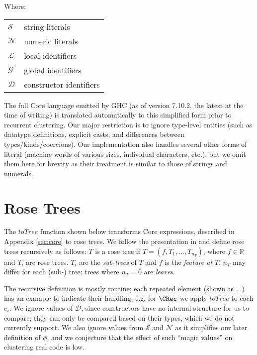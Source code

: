 Where:
\begin{tabular}[t]{l @{ $=$ } l}
  $\mathcal{S}$ & string literals    \\
  $\mathcal{N}$ & numeric literals   \\
  $\mathcal{L}$ & local identifiers  \\
  $\mathcal{G}$ & global identifiers \\
  $\mathcal{D}$ & constructor identifiers
\end{tabular}

The full Core language emitted by GHC (as of version 7.10.2, the latest at the
time of writing) is translated automatically to this simplified form prior to
recurrent clustering. Our major restriction is to ignore type-level entities
(such as datatype definitions, explicit casts, and differences between
types/kinds/coercions). Our implementation also handles several other forms of
literal (machine words of various sizes, individual characters, etc.), but we
omit them here for brevity as their treatment is similar to those of strings and
numerals.

\section{Rose Trees}\label{sec:rosetree}

The $toTree$ function shown below transforms Core expressions, described in
Appendix \ref{sec:core} to rose trees. We follow the presentation in
\cite{blundell2012bayesian} and define rose trees recursively as follows: $T$ is
a rose tree if $T = (f, T_1, \dots, T_{n_T})$, where $f \in \mathbb{R}$ and
$T_i$ are rose trees. $T_i$ are the \emph{sub-trees} of $T$ and $f$ is the
\emph{feature at} $T$. $n_T$ may differ for each (sub-) tree; trees where
$n_T = 0$ are \emph{leaves}.

The recursive definition is mostly routine; each repeated element (shown as
$\dots$) has an example to indicate their handling, e.g. for $\CRec$ we apply
$toTree$ to each $e_i$. We ignore values of $\mathcal{D}$, since constructors
have no internal structure for us to compare; they can only be compared based on
their types, which we do not currently support. We also ignore values from
$\mathcal{S}$ and $\mathcal{N}$ as it simplifies our later definition of $\phi$,
and we conjecture that the effect of such ``magic values'' on clustering real
code is low.


